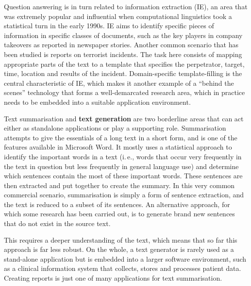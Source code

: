 \begin{multicols}{2}

Question answering is in turn related to information extraction (IE), an area that was extremely popular and influential when computational linguistics took a statistical turn in the early 1990s. IE aims to identify specific pieces of information in specific classes of documents, such as the key players in company takeovers as reported in newspaper stories. Another common scenario that has been studied is reports on terrorist incidents. The task here consists of mapping appropriate parts of the text to a template that specifies the perpetrator, target, time, location and results of the incident. Domain-specific template-filling is the central characteristic of IE, which makes it another example of a “behind the scenes” technology that forms a well-demarcated research area, which in practice needs to be embedded into a suitable application environment.

Text summarisation and \textbf{text generation} are two borderline areas
that can act either as standalone applications or play a supporting
role. Summarisation attempts to give the essentials of a long text in a short
form, and is one of the features available in Microsoft Word. It mostly uses a
statistical approach to identify the important words in a text (i.\,e.,
words that occur very frequently in the text in question but less frequently
in general language use) and determine which sentences contain the most of
these important words. These sentences are then extracted and put
together to create the summary.  In this very common commercial scenario, summarisation is simply a form of sentence extraction, and the text is reduced to a subset of its sentences. An alternative approach, for which some research has been carried out, is to generate brand new sentences that do not exist in the source text. 

 

This requires a deeper understanding of the text, which means that so
far this approach is far less robust. On the whole, a text generator
is rarely used as a stand-alone application but is embedded into a
larger software environment, such as a clinical information system
that collects, stores and processes patient data. Creating reports is
just one of many applications for text summarisation. 


\end{multicols}
